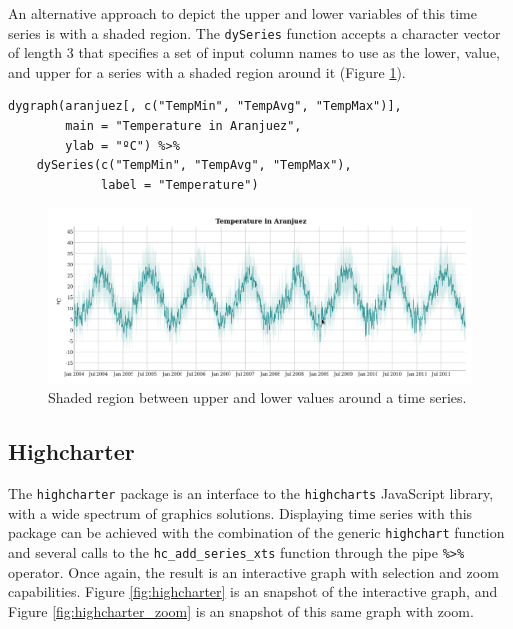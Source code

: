An alternative approach to depict the upper and lower variables of this time series is with a shaded region. The \texttt{dySeries} function accepts a character vector of length 3 that specifies a set of input column names to use as the lower, value, and upper for a series with a shaded region  around it (Figure \ref{fig:dygraphs_maxmin}).
\lstset{language=r,label= ,caption= ,captionpos=b,numbers=none}
\begin{lstlisting}
dygraph(aranjuez[, c("TempMin", "TempAvg", "TempMax")],
        main = "Temperature in Aranjuez",
        ylab = "ºC") %>%
    dySeries(c("TempMin", "TempAvg", "TempMax"),
             label = "Temperature")
\end{lstlisting}

\begin{figure}[htbp]
\centering
\includegraphics[width=.9\linewidth]{figs/dygraphs_aranjuez_maxmin.png}
\caption{Shaded region between upper and lower values around a time series. \label{fig:dygraphs_maxmin}}
\end{figure}

\subsection{Highcharter \label{sec:highcharter}}
\label{sec:orgc74fb2e}

The \texttt{highcharter} package is an interface to the \texttt{highcharts}
JavaScript library, with a wide spectrum of graphics
solutions. Displaying time series with this package can be achieved
with the combination of the generic \texttt{highchart} function and several
calls to the \texttt{hc\_add\_series\_xts} function through the pipe \texttt{\%>\%}
operator.  Once again, the result is an interactive graph with
selection and zoom capabilities. Figure \ref{fig:highcharter} is an
snapshot of the interactive graph, and Figure
\ref{fig:highcharter_zoom} is an snapshot of this same graph with
zoom.


